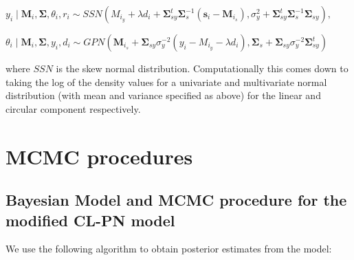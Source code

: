 \documentclass[12pt,]{article}
\begin{document}
\begin{itemize}
$y_i \mid \boldsymbol{M}_i, \boldsymbol{\Sigma}, \theta_i, r_i \sim SSN(M_{i_y} + \lambda d_i + \boldsymbol{\Sigma}_{sy}^t\boldsymbol{\Sigma}_s^{-1}(\boldsymbol{s}_i - \boldsymbol{M}_{i_s}), \sigma^2_y + \boldsymbol{\Sigma}_{sy}^t\boldsymbol{\Sigma}_s^{-1}\boldsymbol{\Sigma}_{sy}),$

$\theta_i \mid \boldsymbol{M}_i, \boldsymbol{\Sigma}, y_i, d_i \sim GPN(\boldsymbol{M}_{i_s} + \boldsymbol{\Sigma}_{sy}\sigma^{-2}_y(y_i - M_{i_y} - \lambda d_i), \boldsymbol{\Sigma}_s + \boldsymbol{\Sigma}_{sy}\sigma_y^{-2}\boldsymbol{\Sigma}_{sy}^t)$

where $SSN$ is the skew normal distribution. Computationally this comes down to taking the log of the density values for a univariate and multivariate normal distribution (with mean and variance specified as above) for the linear and circular component respectively.

\end{itemize}

\section{MCMC procedures}
\subsection{Bayesian Model and MCMC procedure for the modified CL-PN model}\label{A1}

We use the following algorithm to obtain posterior estimates from the
model:
\end{document}
